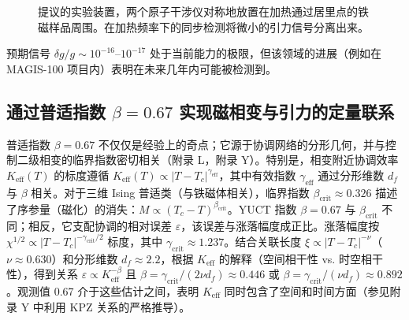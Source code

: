 \documentclass[12pt]{article}
\theoremstyle{remark}
\newcommand{\Keff}{K_{\mathrm{eff}}}
\begin{document}
	\begin{figure}[htbp]
		\centering
		\caption{提议的实验装置，两个原子干涉仪对称地放置在加热通过居里点的铁磁样品周围。在加热频率下的同步检测将微小的引力信号分离出来。}
		\label{fig:lab-setup}
	\end{figure}
	
	预期信号 $\delta g/g \sim 10^{-16}$–$10^{-17}$ 处于当前能力的极限，但该领域的进展（例如在 MAGIS-100 项目内）表明在未来几年内可能被检测到。
	
	\subsection{通过普适指数 $\beta = 0.67$ 实现磁相变与引力的定量联系}
	\label{subsec:magnetic-gravity-link}
	
	普适指数 $\beta = 0.67$ 不仅仅是经验上的奇点；它源于协调网络的分形几何，并与控制二级相变的临界指数密切相关（附录 L，附录 Y）。特别是，相变附近协调效率 $\Keff(T)$ 的标度遵循 $\Keff(T) \propto |T - T_c|^{\gamma_{\mathrm{eff}}}$，其中有效指数 $\gamma_{\mathrm{eff}}$ 通过分形维数 $d_f$ 与 $\beta$ 相关。对于三维 Ising 普适类（与铁磁体相关），临界指数 $\beta_{\mathrm{crit}} \approx 0.326$ 描述了序参量（磁化）的消失：$M \propto (T_c - T)^{\beta_{\mathrm{crit}}}$。YUCT 指数 $\beta = 0.67$ 与 $\beta_{\mathrm{crit}}$ 不同；相反，它支配协调的相对误差 $\varepsilon$，该误差与涨落幅度成正比。涨落幅度按 $\chi^{1/2} \propto |T - T_c|^{-\gamma_{\mathrm{crit}}/2}$ 标度，其中 $\gamma_{\mathrm{crit}} \approx 1.237$。结合关联长度 $\xi \propto |T - T_c|^{-\nu}$（$\nu \approx 0.630$）和分形维数 $d_f \approx 2.2$，根据 $\Keff$ 的解释（空间相干性 vs. 时空相干性），得到关系 $\varepsilon \propto \Keff^{-\beta}$ 且 $\beta = \gamma_{\mathrm{crit}}/(2\nu d_f) \approx 0.446$ 或 $\beta = \gamma_{\mathrm{crit}}/(\nu d_f) \approx 0.892$。观测值 0.67 介于这些估计之间，表明 $\Keff$ 同时包含了空间和时间方面（参见附录 Y 中利用 KPZ 关系的严格推导）。
	
\end{document}
